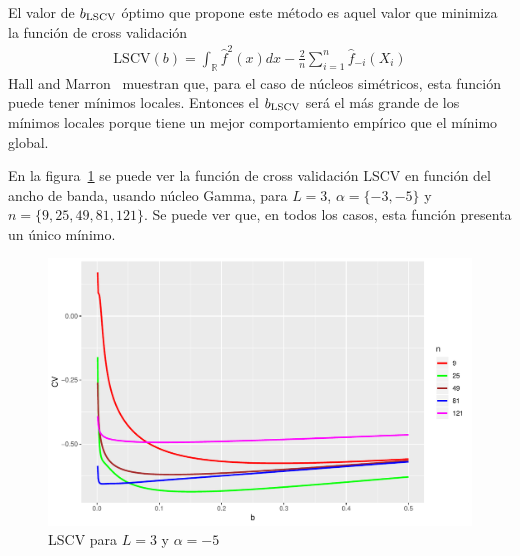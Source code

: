 El valor de $b_{\tiny \text{LSCV}}$ óptimo que propone este método es aquel valor que minimiza la función de cross validación 
\begin{align}
	\text{LSCV}(b)=\int_\mathbb{R} \widehat{f}^2(x)dx - \frac{2}{n}\sum_{i=1}^n \widehat{f}_{-i}(X_i)
	\label{LSCV}
\end{align}
Hall and Marron~\cite{HallMarron1991} muestran que, para el caso de núcleos simétricos, esta función puede tener mínimos locales. Entonces el  $b_{\tiny \text{LSCV}}$ será el más grande de los mínimos locales porque tiene un mejor comportamiento empírico que el mínimo global.

En la figura~\ref{LSCV} se puede ver la función de cross validación LSCV en función del ancho de banda, usando núcleo Gamma, para $L=3$, $\alpha=\{-3,-5\}$ y $n=\{9,25,49,81,121\}$. Se puede ver que, en todos los casos, esta función presenta un único mínimo.

\begin{figure}[hbt]
	\centering 
	\label{LSCV}
	\includegraphics[scale=0.5]{../../Figures/Tesis/Capitulo4/GraficoLSCValfa=-5.pdf}
	\caption{LSCV para $L=3$ y $\alpha=-5$}
\end{figure}



